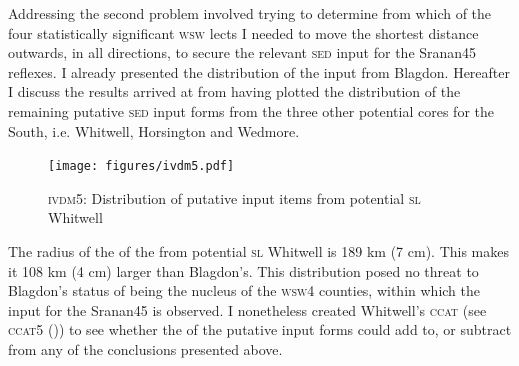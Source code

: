 Addressing the second problem involved trying to determine from which of the four statistically significant \textsc{wsw}  lects I needed to move the shortest distance outwards, in all directions, to secure the relevant \textsc{sed} input for the Sranan45 reflexes. I already presented the distribution of the input from Blagdon. Hereafter I discuss the results arrived at from having plotted the distribution of the remaining putative \textsc{sed} input forms from the three other potential cores for the South, i.e. Whitwell, Horsington and Wedmore.

\begin{figure}

\texttt{[image: figures/ivdm5.pdf]}
\addtocounter{figure}{-1}\renewcommand{\thefigure}{\arabic{figure}.10}
\caption {\textsc{ivdm5}: Distribution of putative input items from potential \textsc{sl} Whitwell} 
\label{Map5.10}
\end{figure}


The radius of the  of the  from potential \textsc{sl} Whitwell is 189 km (7 cm). This makes it 108 km (4 cm) larger than Blagdon's. This distribution posed no threat to Blagdon's status of being the nucleus of the \textsc{wsw4} counties, within which the input for the Sranan45 is observed. I nonetheless created Whitwell's \textsc{ccat} (see \textsc{ccat5} ()) to see whether the  of the putative input forms could add to, or subtract from any of the conclusions presented above.

